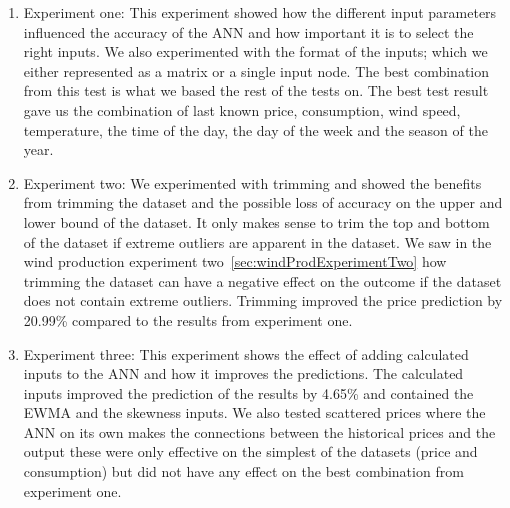 \begin{table}[H]
\centering  %
\caption{The best results from the experiments and the overall improvement.} %
\label{table:OverallImprovement} %
\end{table}

\begin{enumerate}
	\item Experiment one: This experiment showed how the different input parameters influenced the accuracy of the ANN and how important it is to select the right inputs. We also experimented with the format of the inputs; which we either represented as a matrix or a single input node. The best combination from this test is what we based the rest of the tests on. The best test result gave us the combination of last known price, consumption, wind speed, temperature, the time of the day, the day of the week and the season of the year.
	\item Experiment two: We experimented with trimming and showed the benefits from trimming the dataset and the possible loss of accuracy on the upper and lower bound of the dataset. It only makes sense to trim the top and bottom of the dataset if extreme outliers are apparent in the dataset. We saw in the wind production experiment two~\ref{sec:windProdExperimentTwo} how trimming the dataset can have a negative effect on the outcome if the dataset does not contain extreme outliers. Trimming improved the price prediction by 20.99\% compared to the results from experiment one.
	\item Experiment three: This experiment shows the effect of adding calculated inputs to the ANN and how it improves the predictions. The calculated inputs improved the prediction of the results by 4.65\% and contained the EWMA and the skewness inputs. We also tested scattered prices where the ANN on its own makes the connections between the historical prices and the output these were only effective on the simplest of the datasets (price and consumption) but did not have any effect on the best combination from experiment one.

\end{enumerate}
